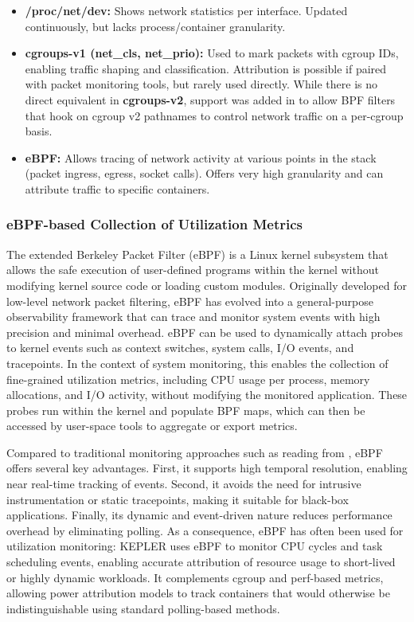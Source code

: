 \begin{itemize}
    \item \textbf{/proc/net/dev:} Shows network statistics per interface. Updated continuously, but lacks process/container granularity.
    \item \textbf{cgroups-v1 (net\_cls, net\_prio):} Used to mark packets with cgroup IDs, enabling traffic shaping and classification. Attribution is possible if paired with packet monitoring tools, but rarely used directly. While there is no direct equivalent in \textbf{cgroups-v2}, support was added in  to allow BPF filters that hook on cgroup v2 pathnames to control network traffic on a per-cgroup basis.
    \item \textbf{eBPF:} Allows tracing of network activity at various points in the stack (packet ingress, egress, socket calls). Offers very high granularity and can attribute traffic to specific containers.
\end{itemize}

\subsubsection{eBPF-based Collection of Utilization Metrics}
\label{sec:ebpf_metrics}

The extended Berkeley Packet Filter (eBPF) is a Linux kernel subsystem that allows the safe execution of user-defined programs within the kernel without modifying kernel source code or loading custom modules. Originally developed for low-level network packet filtering, eBPF has evolved into a general-purpose observability framework that can trace and monitor system events with high precision and minimal overhead. eBPF can be used to dynamically attach probes to kernel events such as context switches, system calls, I/O events, and tracepoints. In the context of system monitoring, this enables the collection of fine-grained utilization metrics, including CPU usage per process, memory allocations, and I/O activity, without modifying the monitored application. These probes run within the kernel and populate BPF maps, which can then be accessed by user-space tools to aggregate or export metrics.

Compared to traditional monitoring approaches such as reading from , eBPF offers several key advantages. First, it supports high temporal resolution, enabling near real-time tracking of events. Second, it avoids the need for intrusive instrumentation or static tracepoints, making it suitable for black-box applications. Finally, its dynamic and event-driven nature reduces performance overhead by eliminating polling. As a consequence, eBPF has often been used for utilization monitoring: KEPLER uses eBPF to monitor CPU cycles and task scheduling events, enabling accurate attribution of resource usage to short-lived or highly dynamic workloads. It complements cgroup and perf-based metrics, allowing power attribution models to track containers that would otherwise be indistinguishable using standard polling-based methods.

